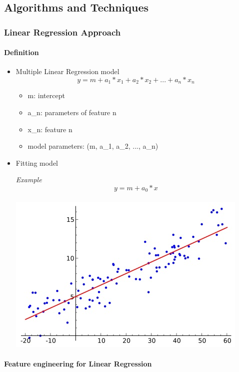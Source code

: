 \documentclass[11pt]{article}
\makeatletter
\def\maxwidth{\ifdim\Gin@nat@width>\linewidth\linewidth
    \else\Gin@nat@width\fi}
\let\Oldincludegraphics\includegraphics
\renewcommand{\includegraphics}[1]{\Oldincludegraphics[width=.8\maxwidth]{#1}}
\providecommand{\tightlist}{%
      \setlength{\itemsep}{0pt}\setlength{\parskip}{0pt}}
\makeatother
\begin{document}
\subsection{Algorithms and Techniques}\label{algorithms-and-techniques}

\subsubsection{Linear Regression
Approach}\label{linear-regression-approach}

\paragraph{Definition}\label{definition-1}

\begin{itemize}
\item
  Multiple Linear Regression model
  \[y = m + a_1*x_1 + a_2*x_2 + ... + a_n*x_n\]

  \begin{itemize}
  \tightlist
  \item
    m: intercept
  \item
    a\_n: parameters of feature n
  \item
    x\_n: feature n
  \item
    model parameters: (m, a\_1, a\_2, ..., a\_n)
  \end{itemize}
\item
  Fitting model

  \emph{Example} \[y = m + a_0*x\] \\
  \includegraphics{./figures/30.jpg}
\end{itemize}

\paragraph{Feature engineering for Linear
Regression}\label{feature-engineering-for-linear-regression}
\end{document}
